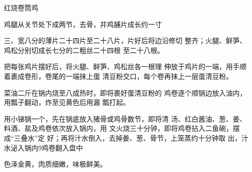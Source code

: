 \begin{recipe}{红烧卷筒鸡}

\ingredients




\cooking

\step 鸡腿从关节处下成两节，去骨，并鸡脯片成长约一寸

三、宽八分的薄片二十四片至二十八片，片好后将边沿修切 整齐；火腿、鲜笋、鸡松分别切成长七分的二粗丝二十四根 至二十八根。

把每张鸡片摆好后，将火腿、鲜笋、鸡松丝各一根理 伸放于鸡片的一端，用手顺着裹成卷形，卷尾的一端抹上蛋 清豆粉交口，每个卷再抹上一层蛋清豆粉。

\step 菜油二斤在锅内烧至八成热时，即将裹好蛋清豆粉的 鸡卷逐个顺锅边放入油内，用瓢子翻动，炸至见黄色后用漏 瓢打起。

\step 用小锑锅一个，先在锅底放入猪骨或鸡骨数节，即将清 汤、红白酱油、葱、姜、料酒、盐及鸡卷依次放入锅内，用 文火烧三十分钟，即将鸡卷拈入二鱼碗，摆成“三叠水”定 好；再将汁水倒入，去掉姜、葱、骨节，上笼蒸约十分钟取 出，汁水泌入锅内9鸡卷翻入盘中

\notes

色泽金黄，肉质细嫩，味极鲜美。

\end{recipe}

